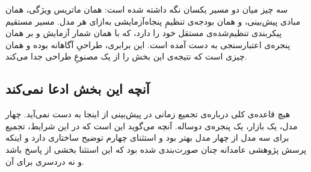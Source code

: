 سه چیز میان دو مسیر یکسان نگه داشته شده است: همان ماتریس ویژگی، همان مبادی پیش‌بینی،
و همان بودجه‌ی تنظیمِ پنجاه‌آزمایشی به‌ازای هر مدل. مسیر مستقیم پیکربندی تنظیم‌شده‌ی
مستقل خود را دارد، که با همان شمار آزمایش و بر همان پنجره‌ی اعتبارسنجی به دست آمده
است. این برابری، طراحیِ آگاهانه بوده و همان چیزی است که نتیجه‌ی این بخش را از یک مصنوعِ
طراحی جدا می‌کند.

\subsection*{آنچه این بخش ادعا نمی‌کند}

هیچ قاعده‌ی کلی درباره‌ی تجمیع زمانی در پیش‌بینی از اینجا به دست نمی‌آید. چهار مدل، یک
بازار، یک پنجره‌ی دوساله. آنچه می‌گوید این است که در این شرایط، تجمیع برای سه مدل از
چهار مدل بهتر بود و استثنای چهارم توضیح ساختاری دارد  و اینکه پرسش پژوهشی
عامدانه چنان صورت‌بندی شده بود که این استثنا بخشی از پاسخ باشد و نه دردسری برای آن.
